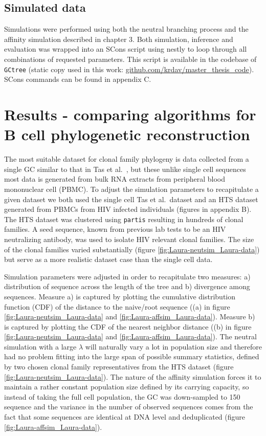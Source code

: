 \subsection{Simulated data}
Simulations were performed using both the neutral branching process and the affinity simulation described in chapter 3.
Both simulation, inference and evaluation was wrapped into an SCons script \cite{fomel2007reproducible} using nestly \cite{mccoy2012nestly} to loop through all combinations of requested parameters.
This script is available in the codebase of \texttt{GCtree} (static copy used in this work: \url{github.com/krdav/master_thesis_code}).
SCons commands can be found in appendix C.





\section{Results - comparing algorithms for B cell phylogenetic reconstruction}
The most suitable dataset for clonal family phylogeny is data collected from a single GC similar to that in Tas et al.\ \cite{tas2016visualizing}, but these unlike single cell sequences most data is generated from bulk RNA extracts from peripheral blood mononuclear cell (PBMC).
To adjust the simulation parameters to recapitulate a given dataset we both used the single cell Tas et al.\ dataset and an HTS dataset generated from PBMCs from HIV infected individuals (figures in appendix B).
The HTS dataset was clustered using \texttt{partis} resulting in hundreds of clonal families.
A seed sequence, known from previous lab tests to be an HIV neutralizing antibody, was used to isolate HIV relevant clonal families.
The size of the clonal families varied substantially (figure \ref{fig:Laura-neutsim_Laura-data}) but serve as a more realistic dataset case than the single cell data.

Simulation parameters were adjusted in order to recapitulate two measures: a) distribution of sequence across the length of the tree and b) divergence among sequences.
Measure a) is captured by plotting the cumulative distribution function (CDF) of the distance to the naive/root sequence ((a) in figure \ref{fig:Laura-neutsim_Laura-data} and \ref{fig:Laura-affsim_Laura-data}).
Measure b) is captured by plotting the CDF of the nearest neighbor distance ((b) in figure \ref{fig:Laura-neutsim_Laura-data} and \ref{fig:Laura-affsim_Laura-data}).
The neutral simulation with a large $\lambda$ will naturally vary a lot in population size and therefore had no problem fitting into the large span of possible summary statistics, defined by two chosen clonal family representatives from the HTS dataset (figure \ref{fig:Laura-neutsim_Laura-data}).
The nature of the affinity simulation forces it to maintain a rather constant population size defined by its carrying capacity, so instead of taking the full cell population, the GC was down-sampled to 150 sequence and the variance in the number of observed sequences comes from the fact that some sequences are identical at DNA level and deduplicated (figure \ref{fig:Laura-affsim_Laura-data}).

